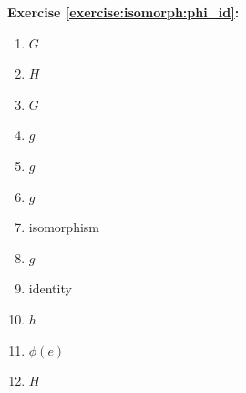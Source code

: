 \noindent\textbf{Exercise \ref{exercise:isomorph:phi_id}:}


\begin{multicols}{3}
\begin{enumerate}
\item
$G$

\item
$H$

\item
$G$

\item
$g$

\item
$g$

\item
$g$

\item
isomorphism

\item
$g$

\item
identity

\item
$h$

\item
$\phi(e)$

\item
$H$
\end{enumerate}
\end{multicols}

